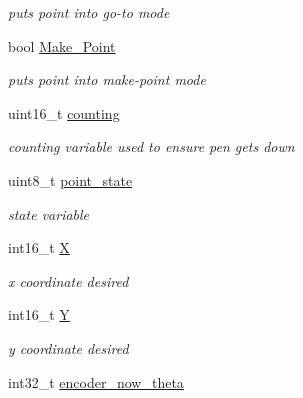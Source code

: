\begin{DoxyCompactItemize}
\begin{DoxyCompactList}\small\item\em puts point into go-\/to mode \end{DoxyCompactList}\item 
\hypertarget{classpoint_aa1887ba10c33201b950564eeeb41ebef}{bool \hyperlink{classpoint_aa1887ba10c33201b950564eeeb41ebef}{Make\-\_\-\-Point}}\label{classpoint_aa1887ba10c33201b950564eeeb41ebef}

\begin{DoxyCompactList}\small\item\em puts point into make-\/point mode \end{DoxyCompactList}\item 
\hypertarget{classpoint_af919b0d5580bbcc3997ec66880fb69e9}{uint16\-\_\-t \hyperlink{classpoint_af919b0d5580bbcc3997ec66880fb69e9}{counting}}\label{classpoint_af919b0d5580bbcc3997ec66880fb69e9}

\begin{DoxyCompactList}\small\item\em counting variable used to ensure pen gets down \end{DoxyCompactList}\item 
\hypertarget{classpoint_a58298128ea4c549b57d6f30b7b2cfb3a}{uint8\-\_\-t \hyperlink{classpoint_a58298128ea4c549b57d6f30b7b2cfb3a}{point\-\_\-state}}\label{classpoint_a58298128ea4c549b57d6f30b7b2cfb3a}

\begin{DoxyCompactList}\small\item\em state variable \end{DoxyCompactList}\item 
\hypertarget{classpoint_a7edf6fd0ef74253e370ec22af74405e6}{int16\-\_\-t \hyperlink{classpoint_a7edf6fd0ef74253e370ec22af74405e6}{X}}\label{classpoint_a7edf6fd0ef74253e370ec22af74405e6}

\begin{DoxyCompactList}\small\item\em x coordinate desired \end{DoxyCompactList}\item 
\hypertarget{classpoint_a19664086f26b511951e44a0a7047620e}{int16\-\_\-t \hyperlink{classpoint_a19664086f26b511951e44a0a7047620e}{Y}}\label{classpoint_a19664086f26b511951e44a0a7047620e}

\begin{DoxyCompactList}\small\item\em y coordinate desired \end{DoxyCompactList}\item 
\hypertarget{classpoint_a86689becd53e88b9cbf5a753538d01fd}{int32\-\_\-t \hyperlink{classpoint_a86689becd53e88b9cbf5a753538d01fd}{encoder\-\_\-now\-\_\-theta}}\label{classpoint_a86689becd53e88b9cbf5a753538d01fd}


\end{DoxyCompactItemize}
